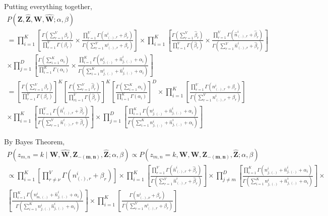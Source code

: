 \documentclass[a4paper]{article}
\begin{document}
Putting everything together,
\begin{multline}
P(\mathbf{Z}, \mathbf{\hat{Z}}, \mathbf{W}, \mathbf{\hat{W}} ; \alpha, \beta) \\ =
\prod_{i=1}^{K} \left[  \frac{\Gamma(\sum_{r=1}^{V} \beta_{r})}{\prod_{r=1}^{V}\Gamma(\beta_{r})} \times \frac{\prod_{r=1}^{V} \Gamma(n_{(.),r}^{i} + \beta_{r} )}{\Gamma(\sum_{r=1}^{V}n_{(.),r}^{i} + \beta_{r} )}\right] \times \prod_{i=1}^{K} \left[   \frac{\Gamma(\sum_{r=1}^{V} \hat{\beta}_{r})}{\prod_{r=1}^{V}\Gamma(\hat{\beta}_{r})} \times \frac{\prod_{r=1}^{V} \Gamma(\hat{n}_{(.),r}^{i} + \hat{\beta}_{r} )}{\Gamma(\sum_{r=1}^{V}\hat{n}_{(.),r}^{i} + \hat{\beta}_{r} )} \right] \\ 
\times \prod_{j=1}^{D} \left[   \frac{\Gamma(\sum_{i=1}^{K} \alpha_{i})}{\prod_{i=1}^{K}\Gamma(\alpha_{i})} \times \frac{\prod_{i=1}^{K} \Gamma(n_{j,(.)}^{i} + \hat{n}_{j,(.)}^{i} +  \alpha_{i} )}{\Gamma(\sum_{i=1}^{K}n_{j,(.)}^{i} + \hat{n}_{j,(.)}^{i} +  \alpha_{i} )} \right] \\ 
= \left[  \frac{\Gamma(\sum_{r=1}^{V} \beta_{r})}{\prod_{r=1}^{V}\Gamma(\beta_{r})} \right]^{K} \left[   \frac{\Gamma(\sum_{r=1}^{V} \hat{\beta}_{r})}{\prod_{r1=1}^{V}\Gamma(\hat{\beta}_{r})}  \right]^{K} 
\left[ \frac{\Gamma(\sum_{i=1}^{K} \alpha_{i})}{\prod_{i=1}^{K}\Gamma(\alpha_{i})} \right]^{D} \times \prod_{i=1}^{K} \left[ \frac{\prod_{r=1}^{V} \Gamma(n_{(.),r}^{i} + \beta_{r} )}{\Gamma(\sum_{r=1}^{V}n_{(.),r}^{i} + \beta_{r} )} \right] \\ \times \prod_{i=1}^{K} \left[ \frac{\prod_{r=1}^{V} \Gamma(\hat{n}_{(.),r}^{i} + \hat{\beta}_{r} )}{\Gamma(\sum_{r=1}^{V}\hat{n}_{(.),r}^{i} + \hat{\beta}_{r} )}  \right] \times \prod_{j=1}^{D} \left[  \frac{\prod_{i=1}^{K} \Gamma(n_{j,(.)}^{i} + \hat{n}_{j,(.)}^{i} +  \alpha_{i} )}{\Gamma(\sum_{i=1}^{K}n_{j,(.)}^{i} + \hat{n}_{j,(.)}^{i} +  \alpha_{i} )} \right]
\end{multline}

By Bayes Theorem, 
\begin{multline}
P(z_{m,n} = k \mid \mathbf{W}, \mathbf{\hat{W}}, \mathbf{Z_{-(m,n)}}, \mathbf{\hat{Z}} ; \alpha, \beta ) \propto   P(z_{m,n} = k, \mathbf{W}, \mathbf{\hat{W}}, \mathbf{Z_{-(m,n)}}, \mathbf{\hat{Z}} ; \alpha, \beta  )\\ 
\propto 
\prod_{i = 1}^{K} \left[ \prod_{r \neq \nu}^{V} \Gamma(n_{(.),r}^{i} + \beta_{r} )\right] \times
\prod_{i=1}^{K} \left[ \frac{\prod_{r=1}^{V} \Gamma(\hat{n}_{(.),r}^{i} + \hat{\beta}_{r} )}{\Gamma(\sum_{r=1}^{V}\hat{n}_{(.),r}^{i} + \hat{\beta}_{r} )}  \right] \times
\prod_{j \neq m}^{D}\left[  \frac{\prod_{i=1}^{K} \Gamma(n_{j,(.)}^{i} + \hat{n}_{j,(.)}^{i} +  \alpha_{i} )}{\Gamma(\sum_{i=1}^{K}n_{j,(.)}^{i} + \hat{n}_{j,(.)}^{i} +  \alpha_{i} )} \right] \times \\
 \left[ \frac{\prod_{i=1}^{K} \Gamma(n_{m,(.)}^{i} + \hat{n}_{j,(.)}^{i} +\alpha_{i})}{\Gamma(\sum_{i=1}^{K} n_{j,(.)}^{i} \hat{n}_{j,(.)}^{i} + \alpha_{i})} \right] \times
 \prod_{i=1}^{K} \left[ \frac{\Gamma(n_{(.),\nu}^{i} + \beta_{\nu})}{\Gamma(\sum_{r=1}^{V} n_{(.),r}^{i} + \beta_{r})} \right]
\end{multline}
\end{document}
